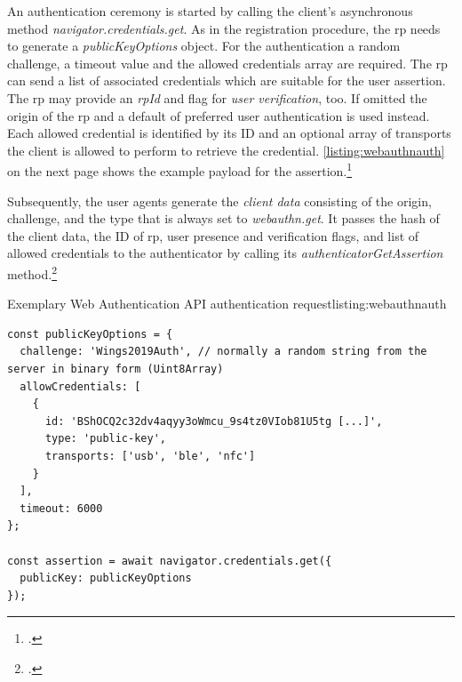 An authentication ceremony is started by calling the client's asynchronous method \textit{navigator.credentials.get}. As in the registration procedure, the \gls{rp} needs to generate a \textit{publicKeyOptions} object. For the authentication a random challenge, a timeout value and the allowed credentials array are required. The \gls{rp} can send a list of associated credentials which are suitable for the user assertion. The \gls{rp} may provide an \textit{rpId} and flag for \textit{user verification}, too. If omitted the origin of the \gls{rp} and a default of preferred user authentication is used instead. Each allowed credential is identified by its ID and an optional array of transports the client is allowed to perform to retrieve the credential. \autoref{listing:webauthnauth} on the next page shows the example payload for the assertion.\footcites[See][Chapter 5.1.4., 5.5, 5.10.3.]{w3c}

Subsequently, the user agents generate the \textit{client data} consisting of the origin, challenge, and the type that is always set to \textit{webauthn.get}. It passes the hash of the client data, the ID of \gls{rp}, user presence and verification flags, and list of allowed credentials to the authenticator by calling its \textit{authenticatorGetAssertion} method.\footcites[See][Chapter 6.3.3]{w3c}
\\
\begin{example}{Exemplary Web Authentication API authentication request}{listing:webauthnauth}
\begin{verbatim}
const publicKeyOptions = {
  challenge: 'Wings2019Auth', // normally a random string from the server in binary form (Uint8Array)
  allowCredentials: [
    {
      id: 'BShOCQ2c32dv4aqyy3oWmcu_9s4tz0VIob81U5tg [...]',
      type: 'public-key',
      transports: ['usb', 'ble', 'nfc']
    }
  ],
  timeout: 6000
};

const assertion = await navigator.credentials.get({
  publicKey: publicKeyOptions
});
\end{verbatim}
\end{example}

